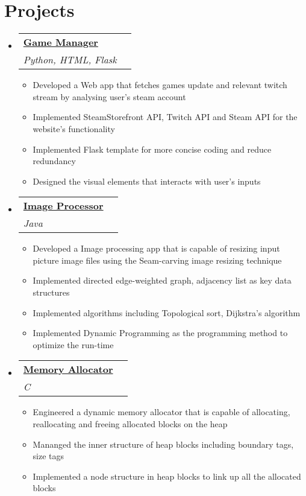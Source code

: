 \documentclass[letterpaper,11pt]{article}
\makeatletter
\newcommand{\resumeProject}[2]{
  \item\small{
    \textbf{#1}{#2 \vspace{-2pt}}
  }
}
\newcommand{\resumeSubheading}[4]{
  \vspace{-1pt}\item
    \begin{tabular*}{0.97\textwidth}{l@{\extracolsep{\fill}}r}
      \textbf{#1} & #2 \\
      \textit{\small#3} & \textit{\small #4} \\
    \end{tabular*}\vspace{-7pt}
}
\newcommand{\resumeSubHeadingListStart}{\begin{itemize}[leftmargin=*]}
\newcommand{\resumeSubHeadingListEnd}{\end{itemize}}
\newcommand{\resumeItemListStart}{\begin{itemize}}
\newcommand{\resumeItemListEnd}{\end{itemize}\vspace{-8pt}}
\makeatother
\begin{document}
\section{Projects}
  \resumeSubHeadingListStart
     \resumeSubheading
      {\href{https://github.com/georgewang0608/game-manager}{Game Manager}}{}
      {Python, HTML, Flask}{}
      \resumeItemListStart
      \resumeProject{}
          {Developed a Web app that fetches games update and relevant twitch stream by analysing user's steam account}
        \resumeProject{}
          {Implemented SteamStorefront API, Twitch API and Steam API for the website's functionality}
        \resumeProject{}
          {Implemented Flask template for more concise coding and reduce redundancy}
         \resumeProject{}
          {Designed the visual elements that interacts with user's inputs}
      \resumeItemListEnd
      \resumeSubheading
      {\href{https://github.com/georgewang0608/Image-processing}{Image Processor}}{}
      {Java}{}
      \resumeItemListStart
      \resumeProject{}
      {Developed a Image processing app that is capable of resizing input picture image files using the Seam-carving image resizing technique}
        \resumeProject{}
          {Implemented directed edge-weighted graph, adjacency list as key data structures}
        \resumeProject{}
        {Implemented algorithms including Topological sort, Dijkstra's algorithm}
        \resumeProject{}
        {Implemented Dynamic Programming as the programming method to optimize the run-time}
      \resumeItemListEnd
      \resumeSubheading
      {\href{https://github.com/georgewang0608/memory-allocator}{Memory Allocator}}{}
      {C}{}
      \resumeItemListStart
      \resumeProject{}
      {Engineered a dynamic memory allocator that is capable of allocating, reallocating and freeing allocated blocks on the heap}
        \resumeProject{}
          {Mananged the inner structure of heap blocks including boundary tags, size tags}
        \resumeProject{}
          {Implemented a node structure in heap blocks to link up all the allocated blocks}
      \resumeItemListEnd
  \resumeSubHeadingListEnd
  
\end{document}

